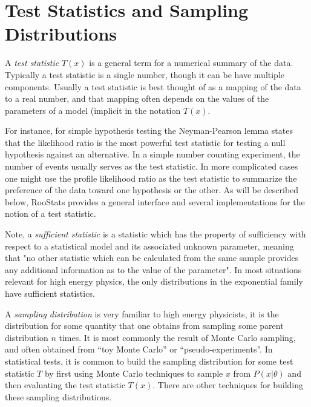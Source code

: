 \documentclass[11pt]{article}
\begin{document}

\section{Test Statistics and Sampling Distributions}\label{S:TestStat}

A \textit{test statistic} $T(x)$ is a general term for a numerical summary of the data.  Typically a test statistic is a single number, though it can be have multiple components.  Usually a test statistic is best thought of as a mapping of the data to a real number, and that mapping often depends on the values of the parameters of a model (implicit in the notation $T(x)$.  

For instance, for simple hypothesis testing the Neyman-Pearson lemma states that the likelihood ratio is the most powerful test statistic for testing a null hypothesis against an alternative.  In a simple number counting experiment, the number of events usually serves as the test statistic.  In more complicated cases one might use the profile likelihood ratio as the test statistic to summarize the preference of the data toward one hypothesis or the other.  As will be described below, RooStats provides a general interface and several implementations for the notion of a test statistic.

Note, a \textit{sufficient statistic} is a statistic which has the property of sufficiency with respect to a statistical model and its associated unknown parameter, meaning that "no other statistic which can be calculated from the same sample provides any additional information as to the value of the parameter".  In most situations relevant for high energy physics, the only distributions in the exponential family have sufficient statistics.

A \textit{sampling distribution} is very familiar to high energy physicists, it is the distribution for some quantity that one obtains from sampling some parent distribution $n$ times.  It is most commonly the result of Monte Carlo sampling, and often obtained from ``toy Monte Carlo'' or ``pseudo-experiments''.  In statistical tests, it is common to build the sampling distribution for some test statistic $T$ by first using Monte Carlo techniques to sample $x$ from $P(x|\theta)$ and then evaluating the test statistic $T(x)$.  There are other techniques for building these sampling distributions.
\end{document}
